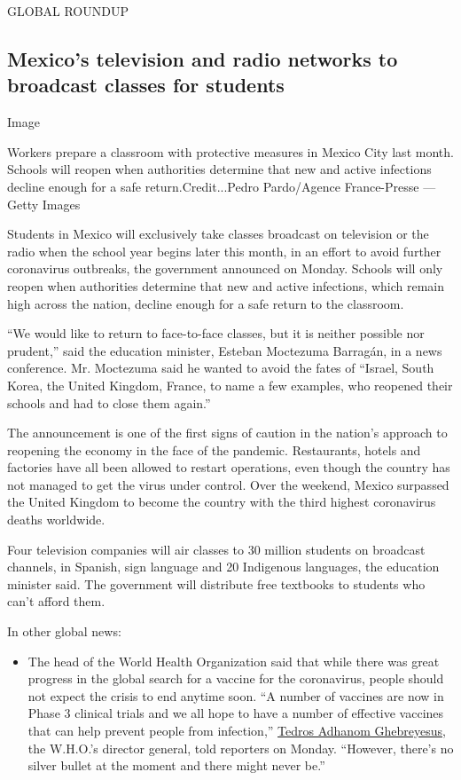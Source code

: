 GLOBAL ROUNDUP

\hypertarget{mexicos-television-and-radio-networks-to-broadcast-classes-for-students}{%
\subsection{Mexico's television and radio networks to broadcast classes
for
students}\label{mexicos-television-and-radio-networks-to-broadcast-classes-for-students}}

Image

Workers prepare a classroom with protective measures in Mexico City last
month. Schools will reopen when authorities determine that new and
active infections decline enough for a safe return.Credit...Pedro
Pardo/Agence France-Presse --- Getty Images

Students in Mexico will exclusively take classes broadcast on television
or the radio when the school year begins later this month, in an effort
to avoid further coronavirus outbreaks, the government announced on
Monday. Schools will only reopen when authorities determine that new and
active infections, which remain high across the nation, decline enough
for a safe return to the classroom.

``We would like to return to face-to-face classes, but it is neither
possible nor prudent,'' said the education minister, Esteban Moctezuma
Barragán, in a news conference. Mr. Moctezuma said he wanted to avoid
the fates of ``Israel, South Korea, the United Kingdom, France, to name
a few examples, who reopened their schools and had to close them
again.''

The announcement is one of the first signs of caution in the nation's
approach to reopening the economy in the face of the pandemic.
Restaurants, hotels and factories have all been allowed to restart
operations, even though the country has not managed to get the virus
under control. Over the weekend, Mexico surpassed the United Kingdom to
become the country with the third highest coronavirus deaths worldwide.

Four television companies will air classes to 30 million students on
broadcast channels, in Spanish, sign language and 20 Indigenous
languages, the education minister said. The government will distribute
free textbooks to students who can't afford them.

In other global news:

\begin{itemize}
\tightlist
\item
  The head of the World Health Organization said that while there was
  great progress in the global search for a vaccine for the coronavirus,
  people should not expect the crisis to end anytime soon. ``A number of
  vaccines are now in Phase 3 clinical trials and we all hope to have a
  number of effective vaccines that can help prevent people from
  infection,'' \href{https://twitter.com/DrTedros}{Tedros Adhanom
  Ghebreyesus}, the W.H.O.'s director general, told reporters on Monday.
  ``However, there's no silver bullet at the moment and there might
  never be.''
\end{itemize}

